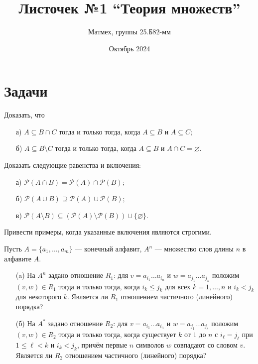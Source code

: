 \documentclass{article}
\title{Листочек №1 ``Теория множеств''}
\author{Матмех, группы 25.Б82-мм}
\date{Октябрь 2024}
\begin{document}
\maketitle

\section{Задачи}

\begin{task}[1]
Доказать, что
\begin{enumerate}
    \item[а)] $A \subseteq B \cap C$ тогда и только тогда, когда $A \subseteq B$ и $A \subseteq C$;
    \item[б)] $A \subseteq B \setminus C$ тогда и только тогда, когда $A \subseteq B$ и $A \cap C = \varnothing$.
\end{enumerate}
\end{task}

\begin{task}[2]
Доказать следующие равенства и включения:
\begin{enumerate}
    \item[а)] $\mathcal{P}(A \cap B) = \mathcal{P}(A) \cap \mathcal{P}(B)$;
    \item[б)] $\mathcal{P}(A \cup B) \supseteq \mathcal{P}(A) \cup \mathcal{P}(B)$;
    \item[в)] $\mathcal{P}(A \setminus B) \subseteq (\mathcal{P}(A) \setminus \mathcal{P}(B)) \cup \{\varnothing\}$.
\end{enumerate}
Привести примеры, когда указанные включения являются строгими.
\end{task}

\begin{task}[3]
Пусть $A = \{a_1, \ldots, a_m\}$ — конечный алфавит, $A^n$ — множество слов длины $n$ в алфавите $A$.
\begin{enumerate}
    \item[(a)] На $A^n$ задано отношение $R_1$: для $v = a_{i_1}\ldots a_{i_n}$ и $w = a_{j_1}\ldots a_{j_n}$ положим $(v,w)\in R_1$ тогда и только тогда, когда $i_k\le j_k$ для всех $k=1,\dots,n$ и $i_k<j_k$ для некоторого $k$. Является ли $R_1$ отношением частичного (линейного) порядка?
    \item[(б)] На $A^*$ задано отношение $R_2$: для $v = a_{i_1}\ldots a_{i_n}$ и $w = a_{j_1}\ldots a_{j_r}$ положим $(v,w)\in R_2$ тогда и только тогда, когда существует $k$ от $1$ до $n$ с $i_\ell=j_\ell$ при $1\le \ell<k$ и $i_k<j_k$, причём первые $n$ символов $w$ совпадают со словом $v$. Является ли $R_2$ отношением частичного (линейного) порядка?
\end{enumerate}
\end{task}
\end{document}
